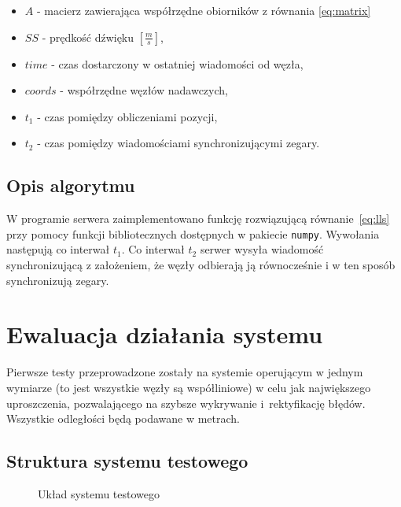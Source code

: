 \begin{itemize}
    \item $A$ - macierz zawierająca współrzędne obiorników z równania \ref{eq:matrix}
    \item $SS$ {-} prędkość dźwięku $\left[\frac{m}{s}\right]$,
    \item $time$ {-} czas dostarczony w ostatniej wiadomości od węzła,
    \item $coords$ {-} współrzędne węzłów nadawczych,
    \item $t_1$ {-} czas pomiędzy obliczeniami pozycji,
    \item $t_2$ {-} czas pomiędzy wiadomościami synchronizującymi zegary.
\end{itemize}

\subsection{Opis algorytmu}

W programie serwera zaimplementowano funkcję rozwiązującą równanie~\ref{eq:lls} przy pomocy funkcji bibliotecznych dostępnych w pakiecie \texttt{numpy}. Wywołania następują co interwał $t_1$. Co interwał $t_2$ serwer wysyła wiadomość synchronizującą z założeniem, że węzły odbierają ją równocześnie i w ten sposób synchronizują zegary.

\section{Ewaluacja działania systemu}

Pierwsze testy przeprowadzone zostały na systemie operującym w jednym wymiarze (to jest wszystkie węzły są współliniowe) w celu jak największego uproszczenia, pozwalającego na szybsze wykrywanie i~rektyfikację błędów. Wszystkie odległości będą podawane w metrach.

\subsection{Struktura systemu testowego}

\begin{figure}[h]
    \centering
    \caption{Układ systemu testowego}
    \label{fig:test_setup}
\end{figure}


